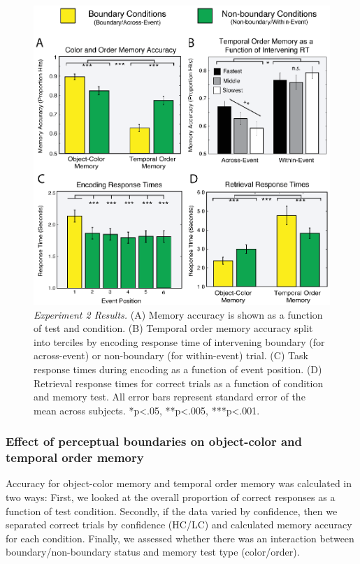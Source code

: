 \begin{figure}
  \centering
  \includegraphics[width=\textwidth]{figures/chapter1_figure3.eps}
  \caption[Behavioral experiment 2 results]{\textit{Experiment 2 Results.} (A) Memory accuracy is shown as a function of test and condition. (B) Temporal order memory accuracy split into terciles by encoding response time of intervening boundary (for across-event) or non-boundary (for within-event) trial.  (C) Task response times during encoding as a function of event position. (D) Retrieval response times for correct trials as a function of condition and memory test. All error bars represent standard error of the mean across subjects.  *p<.05, **p<.005, ***p<.001. }
  \label{chapter1_figure3}
\end{figure}

\subsubsection{Effect of perceptual boundaries on object-color and
temporal order
memory}\label{effect-of-perceptual-boundaries-on-object-color-and-temporal-order-memory}

Accuracy for object-color memory and temporal order memory was
calculated in two ways: First, we looked at the overall proportion of
correct responses as a function of test condition. Secondly, if the data
varied by confidence, then we separated correct trials by confidence
(HC/LC) and calculated memory accuracy for each condition. Finally, we
assessed whether there was an interaction between boundary/non-boundary
status and memory test type (color/order).

